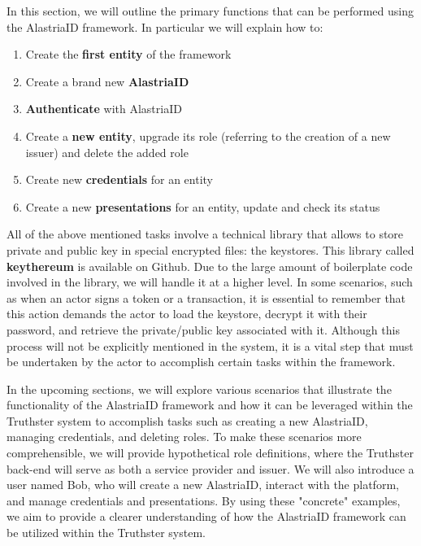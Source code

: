 \documentclass[target=mst,aauheader=]{thud}
\begin{document}
In this section, we will outline the primary functions that can be performed using the AlastriaID framework.
In particular we will explain how to:

\begin{enumerate}

    \item Create the \textbf{first entity} of the framework
    \item Create a brand new \textbf{AlastriaID}
    \item \textbf{Authenticate} with AlastriaID
    \item Create a \textbf{new entity}, upgrade its role (referring to the creation of a new issuer) and delete the added role
    \item Create new \textbf{credentials} for an entity
    \item Create a new \textbf{presentations} for an entity, update and check its status

\end{enumerate}

All of the above mentioned tasks involve a technical library that allows to store private and public key in special encrypted files: the keystores. This library called \textbf{keythereum} is available on Github\cite{keythereum}. Due to the large amount of boilerplate code involved in the library, we will handle it at a higher level. In some scenarios, such as when an actor signs a token or a transaction, it is essential to remember that this action demands the actor to load the keystore, decrypt it with their password, and retrieve the private/public key associated with it. Although this process will not be explicitly mentioned in the system, it is a vital step that must be undertaken by the actor to accomplish certain tasks within the framework.\par
In the upcoming sections, we will explore various scenarios that illustrate the functionality of the AlastriaID framework and how it can be leveraged within the Truthster system to accomplish tasks such as creating a new AlastriaID, managing credentials, and deleting roles. To make these scenarios more comprehensible, we will provide hypothetical role definitions, where the Truthster back-end will serve as both a service provider and issuer. We will also introduce a user named Bob, who will create a new AlastriaID, interact with the platform, and manage credentials and presentations. By using these "concrete" examples, we aim to provide a clearer understanding of how the AlastriaID framework can be utilized within the Truthster system.
\end{document}
